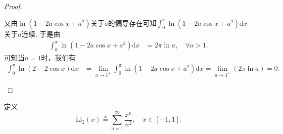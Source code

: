 \documentclass[../../main.tex]{subfiles}%
\begin{document}
\begin{proof}
\begin{enumerate}
又由\(\ln(1 - 2a\cos x + a^2)\)关于\(a\)的偏导存在可知\(\int_0^{\pi} \ln(1 - 2a\cos x + a^2) \mathrm{d}x\)关于\(a\)连续. 于是由
\\
\begin{align*}
\int_0^{\pi} \ln(1 - 2a\cos x + a^2) \mathrm{d}x &= 2\pi \ln a, \quad \forall a > 1.
\end{align*}
可知当\(a = 1\)时，我们有
\\
\begin{align*}
\int_0^{\pi} \ln(2 - 2\cos x) \mathrm{d}x &= \lim_{a \to 1^+} \int_0^{\pi} \ln(1 - 2a\cos x + a^2) \mathrm{d}x = \lim_{a \to 1^+} (2\pi \ln a) = 0.
\end{align*} 
\end{enumerate}

\end{proof}

\begin{definition}
定义  
\[
\mathrm{Li}_2(x) \triangleq \sum_{n=1}^{\infty} \frac{x^n}{n^2}, \quad x \in [-1,1].
\] 
\end{definition}
\end{document}

